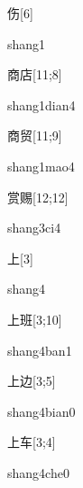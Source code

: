 \begin{verbete}[shang1]{伤}[6]
\begin{pronuncia}{shang1}
\end{pronuncia}
\end{verbete}

\begin{verbete}{商店}[11;8]
\begin{pronuncia}{shang1dian4}
\end{pronuncia}
\end{verbete}

\begin{verbete}{商贸}[11;9]
\begin{pronuncia}{shang1mao4}
\end{pronuncia}
\end{verbete}

\begin{verbete}[shang3ci4]{赏赐}[12;12]
\begin{pronuncia}{shang3ci4}
\end{pronuncia}
\end{verbete}

\begin{verbete}[shang4]{上}[3]
\begin{pronuncia}{shang4}
\end{pronuncia}
\end{verbete}

\begin{verbete}{上班}[3;10]
\begin{pronuncia}{shang4ban1}
\end{pronuncia}
\end{verbete}

\begin{verbete}{上边}[3;5]
\begin{pronuncia}{shang4bian0}
\end{pronuncia}
\end{verbete}

\begin{verbete}{上车}[3;4]
\begin{pronuncia}{shang4che0}
\end{pronuncia}
\end{verbete}

